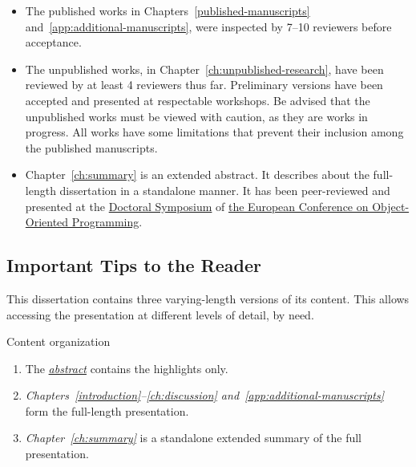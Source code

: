 \begin{itemize}

\item The published works in Chapters~\autoref{published-manuscripts}
and~\autoref{app:additional-manuscripts}, were inspected by 7--10 reviewers
before acceptance.

\item The unpublished works, in Chapter~\autoref{ch:unpublished-research}, have
been reviewed by at least 4 reviewers thus far. Preliminary versions have been
accepted and presented at respectable workshops. Be advised that the unpublished
works must be viewed with caution, as they are works in progress. All works have
some limitations that prevent their inclusion among the published manuscripts.

\item Chapter~\autoref{ch:summary} is an extended abstract. It describes about
the full-length dissertation in a standalone manner. It has been peer-reviewed
and presented at the
\href{https://2025.ecoop.org/track/ecoop-2025-doctoral-symposium}{Doctoral
Symposium} of \href{https://2025.ecoop.org}{the European Conference on
Object-Oriented Programming}.

\end{itemize}

\subsection{Important Tips to the Reader}
\label{subsec:tips}

This dissertation contains three varying-length versions of its content.
This allows accessing the presentation at different levels of detail, by need.

\begin{infobox}[]{Content organization}
\begin{enumerate}[wide, labelwidth=!, labelindent=0pt]

\item The \emph{\hyperref[abs]{abstract}} contains the highlights only.

\item \emph{Chapters~\autoref{introduction}--\autoref{ch:discussion}
and~\autoref{app:additional-manuscripts}} form the full-length presentation.

\item \emph{Chapter~\autoref{ch:summary}} is a standalone extended summary of
the full presentation.
\end{enumerate}
\end{infobox}

